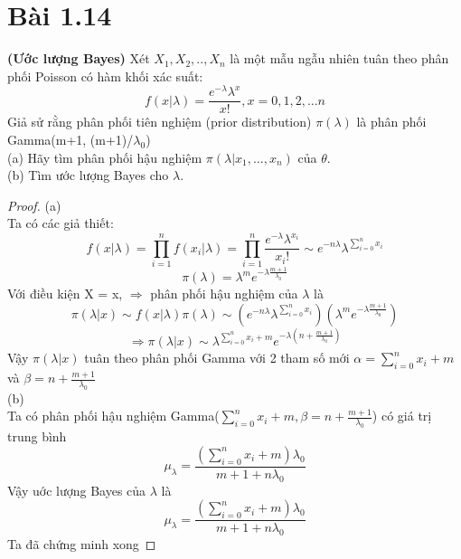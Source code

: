 \section*{Bài 1.14}
%

\begin{problem}{1.14}
\textbf{(Ước lượng Bayes)} Xét $X_1, X_2,.., X_n$ là một mẫu ngẫu nhiên  tuân theo phân phối Poisson có hàm khối xác suất:
\begin{equation*}
f(x|\lambda)=\frac{e^{-\lambda}\lambda^x}{x!} , x=0, 1, 2,... n
\end{equation*}
Giả sử rằng phân phối tiên nghiệm (prior distribution) $\pi(\lambda)$ là phân phối Gamma(m+1, (m+1)/$\lambda_0$)\\
(a) Hãy tìm phân phối hậu nghiệm $\pi(\lambda|x_1,...,x_n)$ của $\theta$.\\
(b) Tìm ước lượng Bayes cho $\lambda$.
\end{problem}

\begin{proof}
(a)\\
Ta có các giả thiết:
\begin{equation*}
f(x|\lambda)=\prod_{i=1}^nf(x_i|\lambda)=\prod_{i=1}^n\frac{e^{-\lambda}\lambda^{x_i}}{x_i!} \sim e^{-n\lambda}\lambda^{\sum_{i=0}^n{x_i}}
\end{equation*}
\begin{equation*}
\pi(\lambda) = \lambda^me^{-\lambda\frac{m+1}{\lambda_0}}
\end{equation*}
Với điều kiện X = x, $\Rightarrow$ phân phối hậu nghiệm của $\lambda$ là
\begin{equation*}
\pi(\lambda|x)\sim f(x|\lambda)\pi(\lambda)\sim (e^{-n\lambda}\lambda^{\sum_{i=0}^n{x_i}})(\lambda^me^{-\lambda\frac{m+1}{\lambda_0}})
\end{equation*}
\begin{equation*}
\Rightarrow\pi(\lambda|x)\sim \lambda^{\sum_{i=0}^n{x_i}+m}e^{-\lambda(n+\frac{m+1}{\lambda_0})}
\end{equation*}
Vậy $\pi(\lambda|x)$ tuân theo phân phối Gamma với 2 tham số mới $\alpha = \sum_{i=0}^n{x_i}+m$  và $\beta=n+\frac{m+1}{\lambda_0}$\\
(b) \\
Ta có phân phối hậu nghiệm Gamma($\sum_{i=0}^n{x_i}+m, \beta=n+\frac{m+1}{\lambda_0}$) có giá trị trung bình
\begin{equation*}
\mu_\lambda=\frac{(\sum_{i=0}^n{x_i}+m)\lambda_0}{m+1+n\lambda_0}
\end{equation*}
Vậy uớc lượng Bayes của $\lambda$ là
\begin{equation*}
\mu_\lambda=\frac{(\sum_{i=0}^n{x_i}+m)\lambda_0}{m+1+n\lambda_0}
\end{equation*}
Ta đã chứng minh xong
\end{proof}
